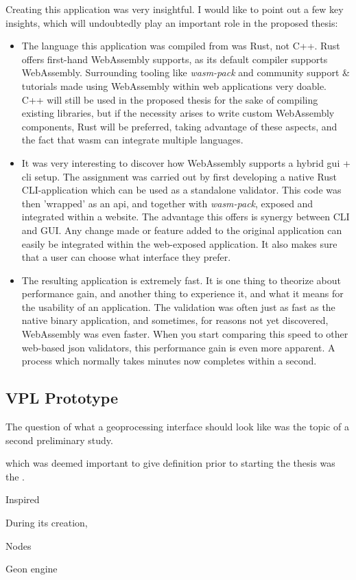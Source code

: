 Creating this application was very insightful. I would like to point out a few key insights, which will undoubtedly play an important role in the proposed thesis: 

\begin{itemize}

    \item The language this application was compiled from was Rust, not C++. Rust offers first-hand WebAssembly supports, as its default compiler supports WebAssembly. Surrounding tooling like \textit{wasm-pack} and community support \& tutorials made using WebAssembly within web applications very doable. 
    C++ will still be used in the proposed thesis for the sake of compiling existing libraries, but if the necessity arises to write custom WebAssembly components, Rust will be preferred, taking advantage of these aspects, and the fact that wasm can integrate multiple languages.

    \item It was very interesting to discover how WebAssembly supports a hybrid gui + cli setup. 
    The assignment was carried out by first developing a native Rust CLI-application which can be used as a standalone validator. 
    This code was then 'wrapped' as an api, and together with \textit{wasm-pack}, exposed and integrated within a website. 
    The advantage this offers is synergy between CLI and GUI. Any change made or feature added to the original application can easily be integrated within the web-exposed application. It also makes sure that a user can choose what interface they prefer. 


    \item The resulting application is extremely fast. It is one thing to theorize about performance gain, and another thing to experience it, and what it means for the usability of an application. The validation was often just as fast as the native binary application, and sometimes, for reasons not yet discovered, WebAssembly was even faster. When you start comparing this speed to other web-based json validators, this performance gain is even more apparent. A process which normally takes minutes now completes within a second. 


\end{itemize}


\subsection*{VPL Prototype}

The question of what a geoprocessing interface should look like was the topic of a second preliminary study. 

which was deemed important to give definition prior to starting the thesis was the . 

Inspired

During its creation, 



Nodes 

Geon engine

